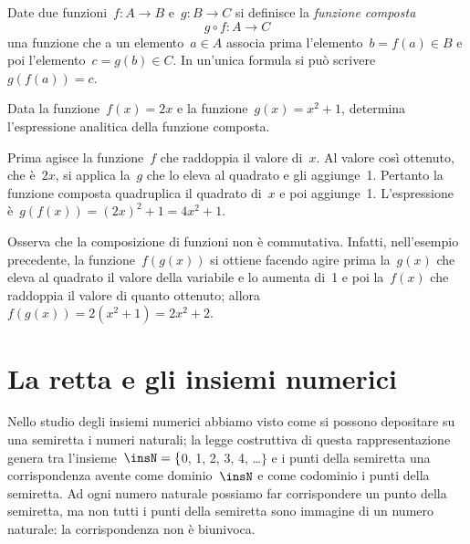 \begin{definizione}
Date due funzioni~$f:A\rightarrow B$ e~$g:B\rightarrow C$ si
definisce la \emph{funzione composta}
\[g\circ f:A\rightarrow C\]
una funzione che a un elemento~$a \in A$ associa prima l'elemento~$b=f(a)\in B$ e
poi l'elemento~$c=g(b) \in C$. In un'unica
formula si può scrivere~$g(f(a))=c$.
\end{definizione}
\pagebreak
\begin{exrig}
 \begin{esempio}
 Data la funzione~$f(x)=2x$ e la funzione~$g(x)=x^2+1$, determina
l'espressione analitica della funzione composta.

Prima agisce la funzione~$f$ che raddoppia il valore di~$x$. Al valore
così ottenuto, che è~$2x$, si applica la~$g$ che lo eleva al quadrato
e gli aggiunge~1. Pertanto
la funzione composta quadruplica il quadrato di~$x$ e poi aggiunge~1.
L'espressione è~$g(f(x))=(2x)^2+1 = 4x^2+1$.
 \end{esempio}

\begin{center}
 
\end{center}

\end{exrig}

Osserva che la composizione di funzioni non è commutativa. Infatti, nell'esempio precedente, la
funzione~$f(g(x))$ si ottiene facendo agire prima la~$g(x)$ che eleva
al quadrato il valore della variabile e lo aumenta di~1
e poi la~$f(x)$ che raddoppia il valore di quanto ottenuto;
allora~$f(g(x))=2(x^2+1)=2x^2+2$.

\vspazio\ovalbox{\risolvii \ref{ese:\thechapter.13}, \ref{ese:\thechapter.14}, \ref{ese:\thechapter.15}, \ref{ese:\thechapter.16}}

\section{La retta e gli insiemi numerici}

Nello studio degli insiemi numerici abbiamo visto come si possono depositare su una semiretta i numeri naturali;
la legge costruttiva di questa rappresentazione genera tra l'insieme~$\insN=\{$0, 1, 2, 3, 4, \ldots$\}$ e i punti della
semiretta una corrispondenza avente come dominio~$\insN$ e come codominio i punti della semiretta.
Ad ogni numero naturale possiamo far corrispondere un punto della semiretta, ma non tutti i punti della semiretta
sono immagine di un numero naturale: la corrispondenza non è biunivoca.

